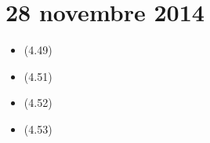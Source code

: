 \section{28 novembre 2014}

\begin{itemize}
    \item (4.49)
    \item (4.51)
    \item (4.52)
    \item (4.53)
\end{itemize}